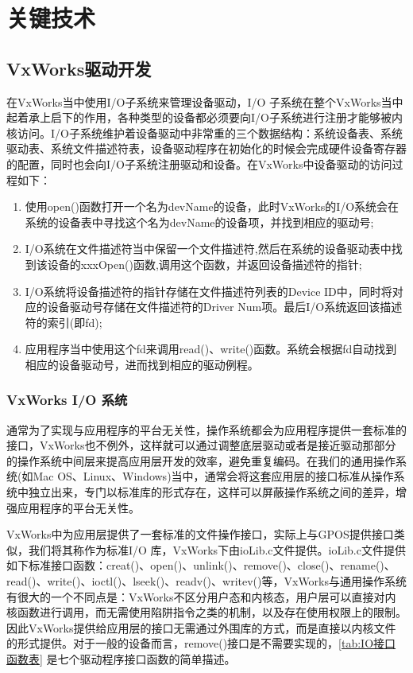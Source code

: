 \section{关键技术}

\subsection{VxWorks驱动开发}
	
	在VxWorks当中使用I/O子系统来管理设备驱动，I/O 子系统在整个VxWorks当中起着承上启下的作用，各种类型的设备都必须要向I/O子系统进行注册才能够被内核访问。I/O子系统维护着设备驱动中非常重的三个数据结构：系统设备表、系统驱动表、系统文件描述符表，设备驱动程序在初始化的时候会完成硬件设备寄存器的配置，同时也会向I/O子系统注册驱动和设备。在VxWorks中设备驱动的访问过程如下：
\begin{enumerate}
\item 使用open()函数打开一个名为devName的设备，此时VxWorks的I/O系统会在系统的设备表中寻找这个名为devName的设备项，并找到相应的驱动号; 
\item I/O系统在文件描述符当中保留一个文件描述符,然后在系统的设备驱动表中找到该设备的xxxOpen()函数,调用这个函数，并返回设备描述符的指针;
\item I/O系统将设备描述符的指针存储在文件描述符列表的Device ID中，同时将对应的设备驱动号存储在文件描述符的Driver Num项。最后I/O系统返回该描述符的索引(即fd);
\item 应用程序当中使用这个fd来调用read()、write()函数。系统会根据fd自动找到相应的设备驱动号，进而找到相应的驱动例程。 
\end{enumerate}

\subsubsection{VxWorks I/O 系统}
	通常为了实现与应用程序的平台无关性，操作系统都会为应用程序提供一套标准的接口，VxWorks也不例外，这样就可以通过调整底层驱动或者是接近驱动那部分的操作系统中间层来提高应用层开发的效率，避免重复编码。在我们的通用操作系统(如Mac OS、Linux、Windows)当中，通常会将这套应用层的接口标准从操作系统中独立出来，专门以标准库的形式存在，这样可以屏蔽操作系统之间的差异，增强应用程序的平台无关性。
	
	VxWorks中为应用层提供了一套标准的文件操作接口，实际上与GPOS提供接口类似，我们将其称作为标准I/O 库，VxWorks下由ioLib.c文件提供。ioLib.c文件提供如下标准接口函数：creat()、open()、unlink()、remove()、close()、rename()、read()、write()、ioctl()、lseek()、readv()、writev()等\cite{BSP开发人员指南}，VxWorks与通用操作系统有很大的一个不同点是：VxWorks不区分用户态和内核态，用户层可以直接对内核函数进行调用，而无需使用陷阱指令之类的机制，以及存在使用权限上的限制。因此VxWorks提供给应用层的接口无需通过外围库的方式，而是直接以内核文件的形式提供。对于一般的设备而言，remove()接口是不需要实现的，\autoref{tab:IO接口函数表} 是七个驱动程序接口函数的简单描述。

